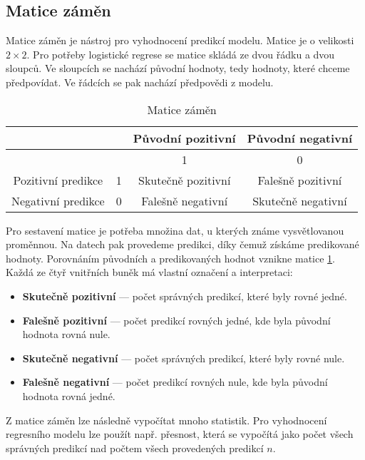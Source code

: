 \subsection{Matice záměn}
Matice záměn je nástroj pro vyhodnocení predikcí modelu. Matice je o velikosti $2 \times 2$. Pro potřeby logistické regrese se matice skládá ze dvou řádku a dvou sloupců.
Ve sloupcích se nachází původní hodnoty, tedy hodnoty, které chceme předpovídat. Ve řádcích se pak nachází předpovědi z modelu.  


\begin{table}[H]
    \centering
    \begin{tabular}{|c|c|c|c|}
        \hline
                           &   & Původní pozitivní   & Původní negativní    \\ \hline
                           &   & 1                  & 0                  \\ \hline
        Pozitivní predikce & 1 & Skutečně pozitivní & Falešně pozitivní  \\ \hline
        Negativní predikce & 0 & Falešně negativní  & Skutečně negativní \\ \hline
    \end{tabular}
    \caption{\label{tab:matice_zamen}Matice záměn}
\end{table}

Pro sestavení matice je potřeba množina dat, u kterých známe vysvětlovanou proměnnou. Na datech pak provedeme predikci, díky čemuž získáme predikované hodnoty. Porovnáním
původních a predikovaných hodnot vznikne matice \ref{tab:matice_zamen}. Každá ze čtyř vnitřních buněk má vlastní označení a interpretaci:

\begin{itemize}
    \item \textbf{Skutečně pozitivní} --- počet správných predikcí, které byly rovné jedné.
    \item \textbf{Falešně pozitivní} --- počet predikcí rovných jedné, kde byla původní hodnota rovná nule.
    \item \textbf{Skutečně negativní} --- počet správných predikcí, které byly rovné nule.
    \item \textbf{Falešně negativní} --- počet predikcí rovných nule, kde byla původní hodnota rovná jedné.
\end{itemize}

Z matice záměn lze následně vypočítat mnoho statistik. Pro vyhodnocení regresního modelu lze použít např. přesnost, která se vypočítá jako počet všech správných predikcí nad
počtem všech provedených predikcí $n$.

